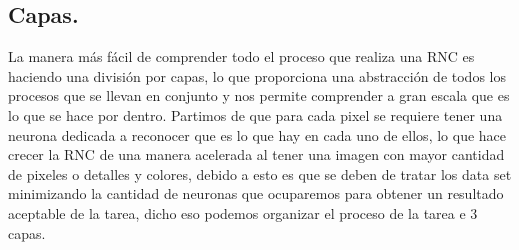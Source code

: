 \documentclass[a4paper, 12pt]{article}
\begin{document}
    \subsection{Capas.} 
    La manera más fácil de comprender todo el proceso que realiza una RNC es haciendo una división por capas, lo que proporciona una abstracción de todos los procesos que se llevan en conjunto y nos permite comprender a gran escala que es lo que se hace por dentro. Partimos de que para cada pixel se requiere tener una neurona dedicada a reconocer que es lo que hay en cada uno de ellos, lo que hace crecer la RNC de una manera acelerada al tener una imagen con mayor cantidad de pixeles o detalles y colores, debido a esto es que se deben de tratar los data set minimizando la cantidad de neuronas que ocuparemos para obtener un resultado aceptable de la tarea, dicho eso podemos organizar el proceso de la tarea e 3 capas.  
\end{document}
